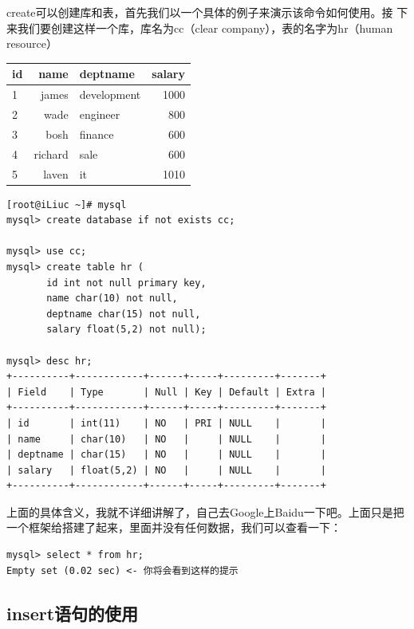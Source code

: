 create可以创建库和表，首先我们以一个具体的例子来演示该命令如何使用。接
下来我们要创建这样一个库，库名为cc（clear company），表的名字为hr（human
resource）

\begin{table}[h]
  \centering
  \begin{tabular}{lrlr}
    \toprule
    id   & name    & deptname       & salary \\
    \midrule
    1    & james   & development    & 1000 \\
    2    & wade    & engineer       & 800 \\
    3    & bosh    & finance        & 600 \\
    4    & richard & sale           & 600 \\
    5    & laven   & it             & 1010 \\
    \bottomrule
  \end{tabular}
\end{table}

\small{
\begin{verbatim}
[root@iLiuc ~]# mysql
mysql> create database if not exists cc;

mysql> use cc;
mysql> create table hr (
       id int not null primary key,
       name char(10) not null,
       deptname char(15) not null,
       salary float(5,2) not null);

mysql> desc hr;
+----------+------------+------+-----+---------+-------+
| Field    | Type       | Null | Key | Default | Extra |
+----------+------------+------+-----+---------+-------+
| id       | int(11)    | NO   | PRI | NULL    |       | 
| name     | char(10)   | NO   |     | NULL    |       | 
| deptname | char(15)   | NO   |     | NULL    |       | 
| salary   | float(5,2) | NO   |     | NULL    |       | 
+----------+------------+------+-----+---------+-------+
\end{verbatim}
}
\normalsize

上面的具体含义，我就不详细讲解了，自己去Google上Baidu一下吧。上面只是把
一个框架给搭建了起来，里面并没有任何数据，我们可以查看一下：

\begin{verbatim}
mysql> select * from hr;
Empty set (0.02 sec) <- 你将会看到这样的提示
\end{verbatim}

\subsection{insert语句的使用}


